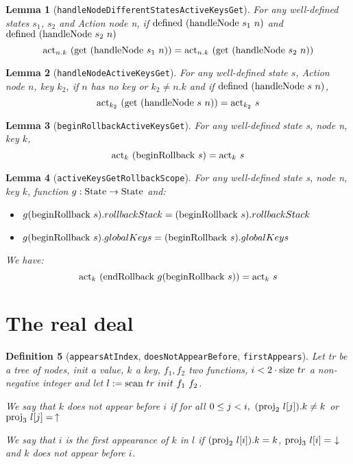 \documentclass{article}
\newtheorem{lemma}{Lemma}
\newtheorem{definition}[lemma]{Definition}
\newcommand{\textfun}[1]{\textup{#1}}
\newcommand{\textcode}[1]{\texttt{#1}}
\newcommand{\longscan}[4]{\textfun{scan}\ #1\ #2\ #3 \ #4}
\newcommand{\up}{\uparrow}
\newcommand{\down}{\downarrow}
\newcommand{\hNode}[2]{\textfun{handleNode}\ #1\ #2}
\newcommand{\beginRb}[1]{\textfun{beginRollback}\ #1}
\newcommand{\enRb}[1]{\textfun{endRollback}\ #1}
\newcommand{\defined}[1]{\textfun{defined}\ #1}
\newcommand{\get}[1]{\textfun{get}\ #1}
\newcommand{\size}[1]{\textfun{size}\ #1}
\newcommand{\snd}[1]{\textfun{proj}_2\ #1}
\newcommand{\trd}[1]{\textfun{proj}_3\ #1}
\newcommand{\state}{\textfun{State}}
\newcommand{\actkey}[2]{\textfun{act}_{#1}\ #2}
\begin{document}
\begin{lemma}[\textcode{handleNodeDifferentStatesActiveKeysGet}]
    \label{same_key_after_hnode}
    For any well-defined states $s_1$, $s_2$ and Action node n, if $\defined{(\hNode{s_ 1}{n})}$ and $\defined{(\hNode{s_ 2}{n})}$ 
    \[\actkey{n.k}{(\get{(\hNode{s_1}{n})})} = \actkey{n.k}{(\get{(\hNode{s_2}{n})})}\]
\end{lemma}


\begin{lemma}[\textcode{handleNodeActiveKeysGet}]
    \label{actkey_handle_node}
    For any well-defined state $s$, Action node $n$, key $k_2$, if $n$ has no key or $k_2 \neq n.k$ and if $\defined{(\hNode{s}{n})}$,
    \[\actkey{k_2}{(\get{(\hNode{s}{n})})} = \actkey{k_2}{s}\]
\end{lemma}

\begin{lemma}[\textcode{beginRollbackActiveKeysGet}]
    \label{act_begin_rb}
    For any well-defined state s, node n, key $k$,
    \[\actkey{k}{(\beginRb{s})} = \actkey{k}{s}\]
\end{lemma}


\begin{lemma}[\textcode{activeKeysGetRollbackScope}]
    \label{skip_rb}
    For any well-defined state s, node n, key $k$, function $g: \state \rightarrow \state $ and:
    \begin{itemize}
        \item $g(\beginRb{s}).rollbackStack = (\beginRb{s}).rollbackStack$
        \item $g(\beginRb{s}).globalKeys = (\beginRb{s}).globalKeys$
    \end{itemize}

    We have:
    \[\actkey{k}{(\enRb{g(\beginRb{s})})} = \actkey{k}{s}\]
    
\end{lemma}






\newpage




\section*{The real deal}


\begin{definition}[\textcode{appearsAtIndex}, \textcode{doesNotAppearBefore}, \textcode{firstAppears}]
    \label{appear_def}
    Let tr be a tree of nodes, init a value, $k$ a key, $f_1, f_2$ two functions, $i < 2 \cdot \size{tr}$ a non-negative integer and let $l := \longscan{tr}{init}{f_1}{f_2}$. 

    We say that $k$ does not appear before $i$ if for all $0 \leq j < i,\  (\snd{l[j]}).k \neq k$ or $\trd{l[j]} =\, \up$

    We say that $i$ is the first appearance of $k$ in $l$ if $(\snd{l[i]}).k = k$, $\trd{l[i]} = \ \down$ and $k$ does not appear before $i$.
\end{definition}
\end{document}
